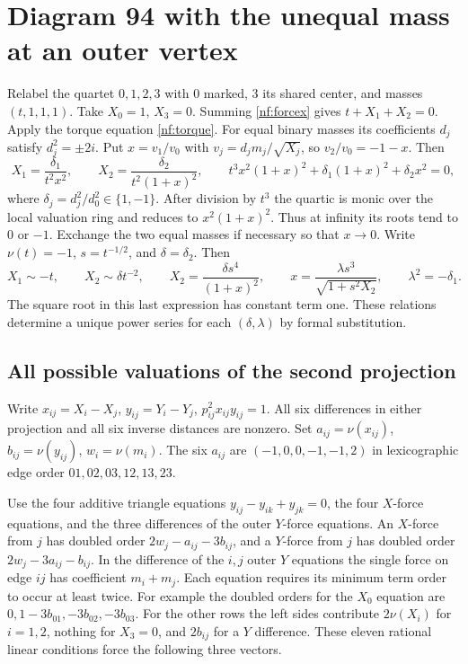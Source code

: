 \documentclass[11pt,letterpaper]{article}
\theoremstyle{definition}
\begin{document}
\section{Diagram 94 with the unequal mass at an outer vertex}\label{nf:outer}
Relabel the quartet $0,1,2,3$ with $0$ marked, $3$ its shared center, and masses $(t,1,1,1)$. Take $X_0=1$, $X_3=0$. Summing \eqref{nf:forcex} gives $t+X_1+X_2=0$. Apply the torque equation \eqref{nf:torque}. For equal binary masses its coefficients $d_j$ satisfy $d_j^2=\pm 2i$. Put $x=v_1/v_0$ with $v_j=d_jm_j/\sqrt{X_j}$, so $v_2/v_0=-1-x$. Then
\[
 X_1=\frac{\delta_1}{t^2x^2},\qquad
 X_2=\frac{\delta_2}{t^2(1+x)^2},\qquad
 t^3x^2(1+x)^2+\delta_1(1+x)^2+\delta_2x^2=0,
\]
where $\delta_j=d_j^2/d_0^2\in\{1,-1\}$. After division by $t^3$ the quartic is monic over the local valuation ring and reduces to $x^2(1+x)^2$. Thus at infinity its roots tend to $0$ or $-1$. Exchange the two equal masses if necessary so that $x\to0$. Write $\nu(t)=-1$, $s=t^{-1/2}$, and $\delta=\delta_2$. Then
\[
 X_1\sim-t,\qquad X_2\sim\delta t^{-2},\qquad
 X_2=\frac{\delta s^4}{(1+x)^2},\qquad
 x=\frac{\lambda s^3}{\sqrt{1+s^2 X_2}},\qquad
 \lambda^2=-\delta_1.
\]
The square root in this last expression has constant term one. These relations determine a unique power series for each $(\delta,\lambda)$ by formal substitution.

\subsection{All possible valuations of the second projection}

Write $x_{ij}=X_i-X_j$, $y_{ij}=Y_i-Y_j$, $p_{ij}^2 x_{ij}y_{ij}=1$. All six differences in either projection and all six inverse distances are nonzero. Set $a_{ij}=\nu(x_{ij})$, $b_{ij}=\nu(y_{ij})$, $w_i=\nu(m_i)$. The six $a_{ij}$ are $(-1,0,0,-1,-1,2)$ in lexicographic edge order $01,02,03,12,13,23$.

Use the four additive triangle equations $y_{ij}-y_{ik}+y_{jk}=0$, the four $X$-force equations, and the three differences of the outer $Y$-force equations. An $X$-force from $j$ has doubled order $2w_j-a_{ij}-3b_{ij}$, and a $Y$-force from $j$ has doubled order $2w_j-3a_{ij}-b_{ij}$. In the difference of the $i,j$ outer $Y$ equations the single force on edge $ij$ has coefficient $m_i+m_j$. Each equation requires its minimum term order to occur at least twice. For example the doubled orders for the $X_0$ equation are
$0,1-3b_{01},-3b_{02},-3b_{03}$.
For the other rows the left sides contribute $2\nu(X_i)$ for $i=1,2$,
nothing for $X_3=0$, and $2b_{ij}$ for a $Y$ difference.
These eleven rational linear conditions force the following three vectors.
\end{document}
